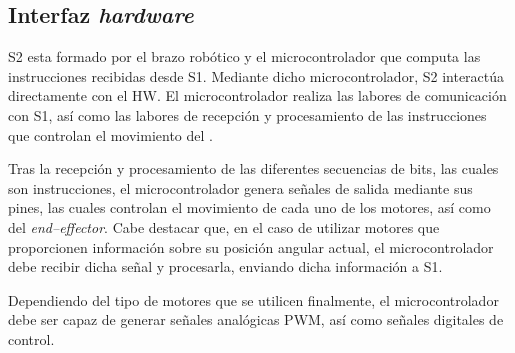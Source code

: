 \subsection{Interfaz \textit{hardware}}
\ac{S2} esta formado por el brazo robótico \pArm{} y el microcontrolador que computa las instrucciones recibidas desde \ac{S1}. Mediante dicho microcontrolador, \ac{S2} interactúa directamente con el \ac{HW}. El microcontrolador realiza las labores de comunicación con \ac{S1}, así como las labores de recepción y procesamiento de las instrucciones que controlan el movimiento del \pArm{}.

Tras la recepción y procesamiento de las diferentes secuencias de bits, las cuales son instrucciones, el microcontrolador genera señales de salida mediante sus pines, las cuales controlan el movimiento de cada uno de los motores, así como del \textit{end--effector}. Cabe destacar que, en el caso de utilizar motores que proporcionen información sobre su posición angular actual, el microcontrolador debe recibir dicha señal y procesarla, enviando dicha información a \ac{S1}.

Dependiendo del tipo de motores que se utilicen finalmente, el microcontrolador debe ser capaz de generar señales analógicas \ac{PWM}, así como señales digitales de control.





